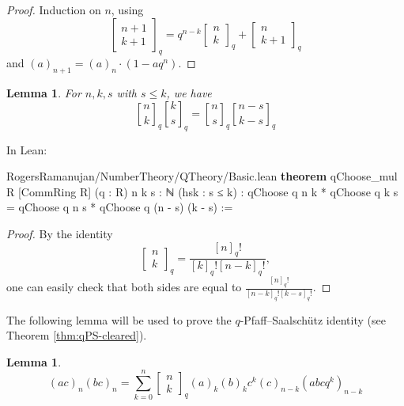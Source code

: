 \documentclass[12pt]{amsart}
\newtheorem{lemma}[theorem]{Lemma}
\theoremstyle{definition}
\theoremstyle{remark}
\numberwithin{equation}{subsection}
\newcommand{\qbin}[2]{\genfrac{[}{]}{0pt}{}{#1}{#2}_{q}}
\newcommand{\kw}[1]{\textcolor{keywordcolor}{\textbf{#1}}}
\newcommand{\var}[1]{\textcolor{tacticcolor}{#1}}
\newcommand{\imp}[1]{\textcolor{commentcolor}{\textbraceleft#1\textbraceright}}
\begin{document}
\begin{proof}
    Induction on $n$, using
    $$
        \begin{bmatrix} n+1 \\ k+1 \end{bmatrix}_q = q^{n-k} \begin{bmatrix}
            n \\ k
        \end{bmatrix}_q + \begin{bmatrix}
            n \\ k + 1
        \end{bmatrix}_q
    $$
    and $(a)_{n+1} = (a)_n \cdot (1 - aq^{n})$.
\end{proof}

\begin{lemma}
    \label{lem:binomial_mul}
    For $n, k, s$ with $s \le k$, we have
    \begin{equation}
        \qbin{n}{k} \qbin{k}{s} = \qbin{n}{s} \qbin{n-s}{k-s}
    \end{equation}
\end{lemma}

In Lean:

\begin{code}{RogersRamanujan/NumberTheory/QTheory/Basic.lean}
\kw{theorem} qChoose_mul \imp{R} [CommRing \var{R}] (\var{q} : \var{R}) {\var{n} \var{k} \var{s} : ℕ} (\var{hsk} : \var{s} ≤ \var{k}) :
  qChoose \var{q} \var{n} \var{k} * qChoose q \var{k} \var{s} = qChoose \var{q} \var{n} \var{s} * qChoose q (\var{n} - \var{s}) (\var{k} - \var{s}) :=
\end{code}

\begin{proof}
    By the identity
    $$
        \begin{bmatrix} n \\ k \end{bmatrix}_q = \frac{[n]_q!}{[k]_q! [n-k]_q!},
    $$
    one can easily check that both sides are equal to $\frac{[n]_q!}{[n-k]_q! [k-s]_q!}$.
\end{proof}

The following lemma will be used to prove the $q$-Pfaff--Saalsch\"utz identity (see Theorem \ref{thm:qPS-cleared}).
\begin{lemma}
    \label{lem:binomial_cauchy_2}
    \begin{equation}
        (ac)_n (bc)_n = \sum_{k=0}^{n} \begin{bmatrix} n \\ k \end{bmatrix}_q (a)_k (b)_k c^k (c)_{n-k} (abcq^k)_{n-k}
    \end{equation}
\end{lemma}
\end{document}
